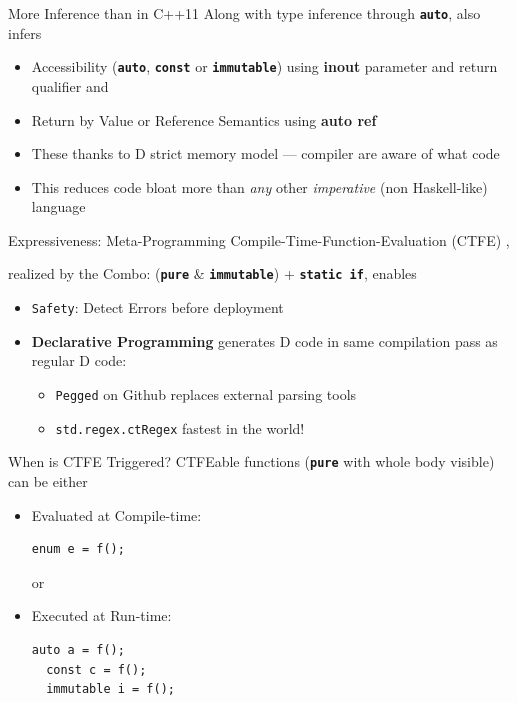 \documentclass[xcolor=dvipsnames]{beamer}
\begin{document}
\begin{frame}[fragile]{More Inference than in C++11}
  Along with type inference through \textbf{\texttt{auto}}, also infers
  \begin{itemize}[<+->]
  \item Accessibility (\textbf{\texttt{auto}}, \textbf{\texttt{const}} or \textbf{\texttt{immutable}}) using \textbf{inout} parameter
    and return qualifier and
  \item Return by Value or Reference Semantics using \textbf{auto ref}
  \item These thanks to D strict memory model --- compiler are aware of what code
  \item This reduces code bloat more than \emph{any} other \emph{imperative}
    (non Haskell-like) language
  \end{itemize}
\end{frame}

\begin{frame}[fragile]{Expressiveness: Meta-Programming}
  Compile-Time-Function-Evaluation (CTFE) ,
  \item realized by the Combo:
  (\textbf{\texttt{pure}} \& \textbf{\texttt{immutable}}) + \textbf{\texttt{static if}}, enables
  \begin{itemize}[<+->]
  \item \texttt{Safety}: Detect Errors before deployment
  \item \textbf{Declarative Programming} generates D code in same compilation
    pass as regular D code:
    \begin{itemize}[<+->]
    \item \texttt{Pegged} on Github replaces external parsing tools
    \item \texttt{std.regex.ctRegex} fastest in the world!
    \end{itemize}
  \end{itemize}
\end{frame}

\begin{frame}[fragile]{When is CTFE Triggered?}
  CTFEable functions (\textbf{\texttt{pure}} with whole body visible) can be either
  \begin{itemize}[<+->]
  \item Evaluated at Compile-time:
\begin{lstlisting}[frame=single]
  enum e = f();
\end{lstlisting}
or
  \item Executed at Run-time:
\begin{lstlisting}[frame=single]
  auto a = f();
  const c = f();
  immutable i = f();
\end{lstlisting}
  \end{itemize}
\end{frame}
\end{document}
